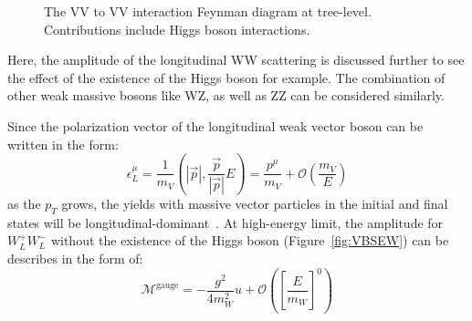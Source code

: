 \begin{figure}[tbp]
\begin{center}
\caption{
The VV to VV interaction Feynman diagram at tree-level. Contributions include Higgs boson interactions.
}
\label{fig:VBSHiggs}
\end{center}
\end{figure}


Here, the amplitude of the longitudinal WW scattering is discussed further to see the effect of the existence of the Higgs boson for example. The combination of other weak massive bosons like WZ, as well as ZZ can be considered similarly. 

Since the polarization vector of the longitudinal weak vector boson can be written in the form: 
\begin{equation}
\epsilon_{L}^{\mu}=\frac{1}{m_{V}}\left(|\vec{p}|, \frac{\vec{p}}{|\vec{p}|} E\right)=\frac{p^{\mu}}{m_{V}}+\mathcal{O}\left(\frac{m_{V}}{E}\right)
\end{equation}
as the $p_{T}$ grows, the yields with massive vector particles in the initial and final states will be longitudinal-dominant~\cite{Rindani_2009}.
At high-energy limit, the amplitude for $W_L^+W_L^-$ without the existence of the Higgs boson (Figure~\ref{fig:VBSEW}) can be describes in the form of:
\begin{equation}
\mathcal{M}^{\text {gauge}}=-\frac{g^{2}}{4 m_{W}^{2}} u+\mathcal{O}\left(\left[\frac{E}{m_{W}}\right]^{0}\right)
\end{equation}


